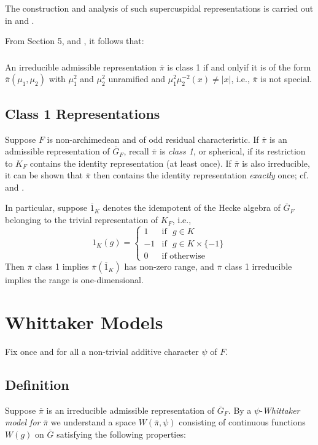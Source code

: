 The construction and analysis of such supercuspidal representations is carried out in \cite{RS} and \cite{Meister}.

From \cite{Ge} Section 5, and \cite{Meister}, it follows that:

\subsubsection{}\label{art1-sec2.4.1}
An irreducible admissible representation $\overline{\pi}$ is class 1 if and only\pageoriginale if it is of the form $\overline{\pi}(\mu_{1},\mu_{2})$ with $\mu^{2}_{1}$ and $\mu^{2}_{2}$ unramified and $\mu^{2}_{1}\mu^{-2}_{2}(x)\neq |x|$, i.e., $\overline{\pi}$ is not special.

\subsection{Class 1 Representations}\label{art1-sec2.5}
Suppose $F$ is non-archimedean and of odd residual characteristic. If $\overline{\pi}$ is an admissible representation of $\overline{G}_{F}$, recall $\overline{\pi}$ is {\em class 1}, or spherical, if its restriction to $K_{F}$ contains the identity representation (at least once). If $\overline{\pi}$ is also irreducible, it can be shown that $\overline{\pi}$ then contains the identity representation {\em exactly} once; cf. \cite{Ge} and \cite{Meister}.

In particular, suppose $\overline{1}_{K}$ denotes the idempotent of the Hecke algebra of $\overline{G}_{F}$ belonging to the trivial representation of $K_{F}$, i.e.,
$$
1_{K}(g)=
\begin{cases}
1 & \text{if~ } g\in K\\
-1 & \text{if~ } g\in K\times \{-1\}\\
0  & \text{if otherwise}
\end{cases}
$$
Then $\overline{\pi}$ class 1 implies $\overline{\pi}(\overline{1}_{K})$ has non-zero range, and $\overline{\pi}$ class 1 irreducible implies the range is one-dimensional.

\section{Whittaker Models}\label{art1-sec3}

Fix once and for all a non-trivial additive character $\psi$ of $F$.

\subsection{Definition}\label{art1-defi3.1}
Suppose $\overline{\pi}$ is an irreducible admissible representation of $\overline{G}_{F}$. By a $\psi$-{\em Whittaker model for} $\overline{\pi}$ we understand a space $W(\overline{\pi},\psi)$ consisting of continuous functions $W(g)$ on $\overline{G}$ satisfying the following properties:

